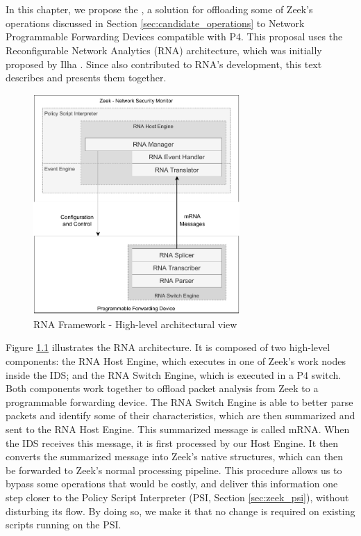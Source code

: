 \chapter{\TheSolutionName{}}
\label{cap:proposal}

In this chapter, we propose the \TheSolutionName{}, a solution for offloading some of Zeek's operations discussed in Section \ref{sec:candidate_operations} to Network Programmable Forwarding Devices compatible with P4. This proposal uses the Reconfigurable Network Analytics (RNA) architecture, which was initially proposed by Ilha \cite{Ilha2022}. Since \TheSolutionName{} also contributed to RNA's development, this text describes and presents them together.

\begin{figure}[h]
    \caption{RNA Framework - High-level architectural view}
    \begin{center}
        \includegraphics[width=0.7\textwidth]{images/arch_high_level.pdf}  
    \end{center}
    \label{fig:arch_high_level}
\end{figure}

Figure \ref{fig:arch_high_level} illustrates the RNA architecture. It is composed of two high-level components: the RNA Host Engine, which executes in one of Zeek's work nodes inside the IDS; and the RNA Switch Engine, which is executed in a P4 switch. Both components work together to offload packet analysis from Zeek to a programmable forwarding device. The RNA Switch Engine is able to better parse packets and identify some of their characteristics, which are then summarized and sent to the RNA Host Engine. This summarized message is called mRNA. When the IDS receives this message, it is first processed by our Host Engine. It then converts the summarized message into Zeek's native structures, which can then be forwarded to Zeek's normal processing pipeline. This procedure allows us to bypass some operations that would be costly, and deliver this information one step closer to the Policy Script Interpreter (PSI, Section \ref{sec:zeek_psi}), without disturbing its flow. By doing so, we make it that no change is required on existing scripts running on the PSI.

